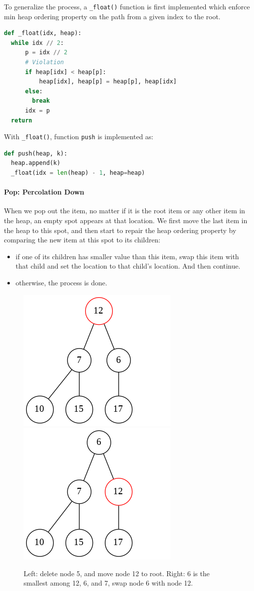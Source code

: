 \documentclass[../main.tex]{subfiles}
\begin{document}
 To generalize the process, a \texttt{\_float()} function is first implemented which enforce min heap ordering property on the path from a given index to the root. 
\begin{lstlisting}[language=Python]
def _float(idx, heap): 
  while idx // 2: 
      p = idx // 2
      # Violation
      if heap[idx] < heap[p]:
          heap[idx], heap[p] = heap[p], heap[idx]
      else:
        break
      idx = p 
  return
\end{lstlisting}
With  \texttt{\_float()}, function \texttt{push} is implemented as:
\begin{lstlisting}[language=Python]
def push(heap, k):
  heap.append(k)
  _float(idx = len(heap) - 1, heap=heap)
\end{lstlisting}

\paragraph{Pop: Percolation Down} When we pop out the item, no matter if it is the root item or any other item in the heap, an empty spot appears at that location. We first move the last item in the heap to this spot, and then start to repair the heap ordering property by comparing the new item at this spot to its children: 
\begin{itemize}
    \item if one of its children has smaller value than this item, swap this item with that child and set the location to that child's location. And then continue.
    \item otherwise, the process is done.
\end{itemize} 
\begin{figure}[h!]
    \centering
    \includegraphics[width = 0.44\columnwidth]{fig/min_heap_insert.png}
    \includegraphics[width = 0.44\columnwidth]{fig/min_heap_insert_step1.png}
        \caption{Left: delete node 5, and move node 12 to root. Right: 6 is the smallest among 12, 6, and 7, swap node 6 with node 12.}
    \label{fig:min-heap-pop}
\end{figure}
\end{document}
